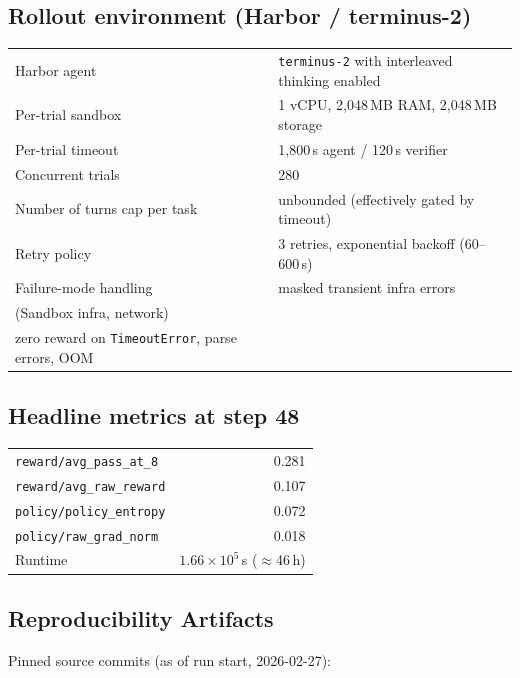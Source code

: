 \documentclass{article}
\begin{document}
\subsection{Rollout environment (Harbor / terminus-2)}

\begin{tabular}{ll}
\toprule
Harbor agent                       & \texttt{terminus-2} with interleaved thinking enabled \\
Per-trial sandbox                  & 1 vCPU, 2{,}048\,MB RAM, 2{,}048\,MB storage \\
Per-trial timeout                  & 1{,}800\,s agent / 120\,s verifier \\
Concurrent trials                  & 280 \\
Number of turns cap per task               & unbounded (effectively gated by timeout) \\
Retry policy                       & 3 retries, exponential backoff (60--600\,s) \\
Failure-mode handling              & masked transient infra errors \\ (Sandbox infra, network) \\ zero reward on \texttt{TimeoutError}, parse errors, OOM \\
\bottomrule
\end{tabular}

\subsection{Headline metrics at step 48}

\begin{tabular}{lr}
\toprule
\texttt{reward/avg\_pass\_at\_8}     & 0.281 \\
\texttt{reward/avg\_raw\_reward}     & 0.107 \\
\texttt{policy/policy\_entropy}      & 0.072 \\
\texttt{policy/raw\_grad\_norm}      & 0.018 \\
Runtime                              & $1.66\times 10^{5}$\,s ($\approx$46\,h) \\
\bottomrule
\end{tabular}

\subsection{Reproducibility Artifacts}
Pinned source commits (as of run start, 2026-02-27):
\end{document}
